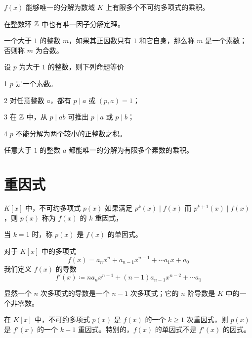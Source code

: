 \begin{theorem}
    $f(x)$ 能够唯一的分解为数域 $K$ 上有限多个不可约多项式的乘积。
\end{theorem}

在整数环 $\mathbb{Z}$ 中也有唯一因子分解定理。

\begin{definition}
    一个大于 $1$ 的整数 $m$，如果其正因数只有 $1$ 和它自身，那么称 $m$ 是一个素数；否则称 $m$ 为合数。
\end{definition}

\begin{theorem}
    设 $p$ 为大于 $1$ 的整数，则下列命题等价

    \num{1} $p$ 是一个素数。

    \num{2} 对任意整数 $a$，都有 $p \mid a$ 或 $(p,a) = 1$；

    \num{3} 在 $\mathbb{Z}$ 中，从 $p \mid ab$ 可推出 $p \mid a$ 或 $p \mid b$；

    \num{4} $p$ 不能分解为两个较小的正整数之积。
\end{theorem}

\begin{theorem}[算术基本定理]
    任意大于 $1$ 的整数 $a$ 都能唯一的分解为有限多个素数的乘积。
\end{theorem}

\section{重因式}

\begin{definition}
    $K[x]$ 中，不可约多项式 $p(x)$ 如果满足 $p^k(x) \mid f(x)$ 而 $p^{k+1}(x) \mid f(x)$，则 $p(x)$ 称为 $f(x)$ 的 $k$ 重因式，
\end{definition}

当 $k=1$ 时，称 $p(x)$ 是 $f(x)$ 的单因式。

\begin{definition}
    对于 $K[x]$ 中的多项式
    \[f(x) = a_nx^n + a_{n-1}x^{n-1} + \cdots a_1 x + a_0\]
    我们定义 $f(x)$ 的导数
    \[f'(x) \coloneqq  na_nx^{n-1} + (n-1)a_{n-1}x^{n-2} + \cdots a_1\]
\end{definition}

显然一个 $n$ 次多项式的导数是一个 $n-1$ 次多项式；它的 $n$ 阶导数是 $K$ 中的一个非零数。

\begin{theorem}
    在 $K[x]$ 中，不可约多项式 $p(x)$ 是 $f(x)$ 的一个 $k \geqslant 1$ 次重因式，则 $p(x)$ 是 $f'(x)$ 的一个 $k-1$ 重因式。特别的，$f(x)$ 的单因式不是 $f'(x)$ 的因式。
\end{theorem}

